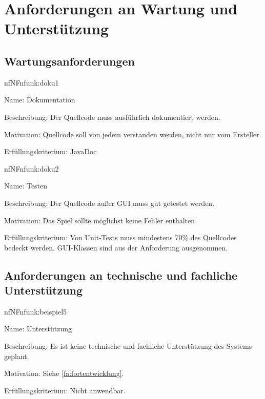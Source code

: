 \section{Anforderungen an Wartung und Unterstützung}

\subsection{Wartungsanforderungen}

\begin{description}[leftmargin=5em, style=sameline]	
	\begin{lhp}{nf}{NF}{nfunk:doku1}
		\item [Name:] Dokumentation
		\item [Beschreibung:] Der Quellcode muss ausführlich dokumentiert werden.
		\item [Motivation:] Quellcode soll von jedem verstanden werden, nicht nur vom Ersteller.
		\item [Erfüllungskriterium:] JavaDoc 
	\end{lhp}
\end{description}

\begin{description}[leftmargin=5em, style=sameline]	
	\begin{lhp}{nf}{NF}{nfunk:doku2}
		\item [Name:] Testen
		\item [Beschreibung:] Der Quellcode außer GUI muss gut getestet werden.
		\item [Motivation:] Das Spiel sollte möglichst keine Fehler enthalten
		\item [Erfüllungskriterium:] Von Unit-Tests muss mindestens 70\% des Quellcodes bedeckt werden. GUI-Klassen sind aus der Anforderung ausgenommen.
	\end{lhp}
\end{description}

\subsection{Anforderungen an technische und fachliche Unterstützung}

\begin{description}[leftmargin=5em, style=sameline]	
	\begin{lhp}{nf}{NF}{nfunk:beispiel5}
		\item [Name:] Unterstützung
		\item [Beschreibung:] Es ist keine technische und fachliche Unterstützung des Systems geplant.
		\item [Motivation:] Siehe \ref{fa:fortentwicklung}.
		\item [Erfüllungskriterium:] Nicht anwendbar.
	\end{lhp}
\end{description}


